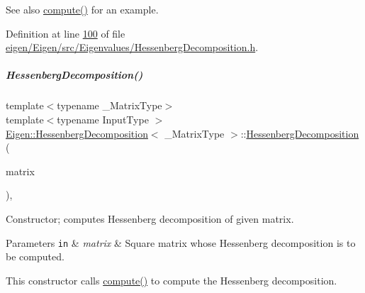 \begin{DoxySeeAlso}{See also}
\hyperlink{group___eigenvalues___module_a239a6fd42c57aab3c0b048c47fde3004}{compute()} for an example. 
\end{DoxySeeAlso}


Definition at line \hyperlink{eigen_2_eigen_2src_2_eigenvalues_2_hessenberg_decomposition_8h_source_l00100}{100} of file \hyperlink{eigen_2_eigen_2src_2_eigenvalues_2_hessenberg_decomposition_8h_source}{eigen/\+Eigen/src/\+Eigenvalues/\+Hessenberg\+Decomposition.\+h}.

\mbox{\label{group___eigenvalues___module_acd22602a3e3e5a02f79990ba1e445dc9}} 
\subparagraph{\texorpdfstring{Hessenberg\+Decomposition()}{HessenbergDecomposition()}\hspace{0.1cm}{\footnotesize\ttfamily [2/4]}}
{\footnotesize\ttfamily template$<$typename \+\_\+\+Matrix\+Type$>$ \\
template$<$typename Input\+Type $>$ \\
\hyperlink{group___eigenvalues___module_class_eigen_1_1_hessenberg_decomposition}{Eigen\+::\+Hessenberg\+Decomposition}$<$ \+\_\+\+Matrix\+Type $>$\+::\hyperlink{group___eigenvalues___module_class_eigen_1_1_hessenberg_decomposition}{Hessenberg\+Decomposition} (\begin{DoxyParamCaption}\item[{const \hyperlink{group___core___module_struct_eigen_1_1_eigen_base}{Eigen\+Base}$<$ Input\+Type $>$ \&}]{matrix }\end{DoxyParamCaption})\hspace{0.3cm}{\ttfamily [inline]}, {\ttfamily [explicit]}}



Constructor; computes Hessenberg decomposition of given matrix. 


\begin{DoxyParams}[1]{Parameters}
\mbox{\tt in}  & {\em matrix} & Square matrix whose Hessenberg decomposition is to be computed.\\
\hline
\end{DoxyParams}
This constructor calls \hyperlink{group___eigenvalues___module_a239a6fd42c57aab3c0b048c47fde3004}{compute()} to compute the Hessenberg decomposition.

